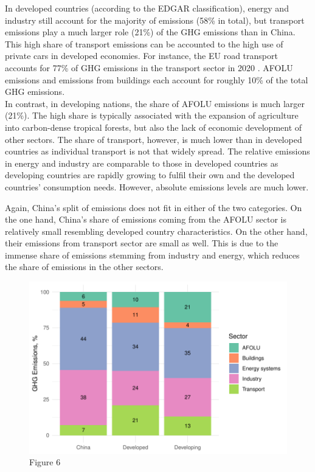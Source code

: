 \documentclass[
  12pt,
]{article}
\numberwithin{equation}{section}
\numberwithin{table}{section}
\numberwithin{figure}{section}
\begin{document}
In developed countries (according to the EDGAR classification), energy
and industry still account for the majority of emissions (58\% in
total), but transport emissions play a much larger role (21\%) of the
GHG emissions than in China. This high share of transport emissions can
be accounted to the high use of private cars in developed economies. For
instance, the EU road transport accounts for 77\% of GHG emissions in
the transport sector in 2020 \citep{EEA2022}. AFOLU emissions and
emissions from buildings each account for roughly 10\% of the total GHG
emissions.\\
In contrast, in developing nations, the share of AFOLU emissions is much
larger (21\%). The high share is typically associated with the expansion
of agriculture into carbon-dense tropical forests, but also the lack of
economic development of other sectors. The share of transport, however,
is much lower than in developed countries as individual transport is not
that widely spread. The relative emissions in energy and industry are
comparable to those in developed countries as developing countries are
rapidly growing to fulfil their own and the developed countries'
consumption needs. However, absolute emissions levels are much lower.

Again, China's split of emissions does not fit in either of the two
categories. On the one hand, China's share of emissions coming from the
AFOLU sector is relatively small resembling developed country
characteristics. On the other hand, their emissions from transport
sector are small as well. This is due to the immense share of emissions
stemming from industry and energy, which reduces the share of emissions
in the other sectors.

\begin{figure}
\centering
\includegraphics{Paper_files/figure-latex/unnamed-chunk-6-1.pdf}
\caption{Figure 6}
\end{figure}
\end{document}

